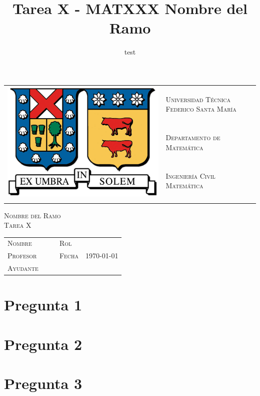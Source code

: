 \documentclass[a4paper,10pt]{article}
\title{Tarea X - MATXXX Nombre del Ramo}
\author{test}
\begin{document}
\begin{tabular}{llr}
    \multirow{3}{*}{\includegraphics[scale=0.18]{utfsm.png}} & \textsc{Universidad Técnica Federico Santa María} & \hspace{20mm} \multirow{2}{*}{\Large \textsc{MATXXX}}\\
    &  \textsc{Departamento de Matemática} \\
    &  \textsc{Ingeniería Civil Matemática}\\
    & \\
\end{tabular}
\vspace{0.1em}
\begin{center}
    \huge{\textsc{Nombre del Ramo\\Tarea X}}
\end{center}

\vspace{1em}

\begin{tabular}{llcll}
    \textsc{Nombre} &  & \hspace{30mm} & \textsc{Rol} & \\
    \textsc{Profesor} &  & \hspace{30mm} & \textsc{Fecha} & \today\\
    \textsc{Ayudante} & \\
\end{tabular}

\section*{Pregunta 1}
    
\newpage

\section*{Pregunta 2}
    
\newpage

\section*{Pregunta 3}
    
\newpage
\end{document}
